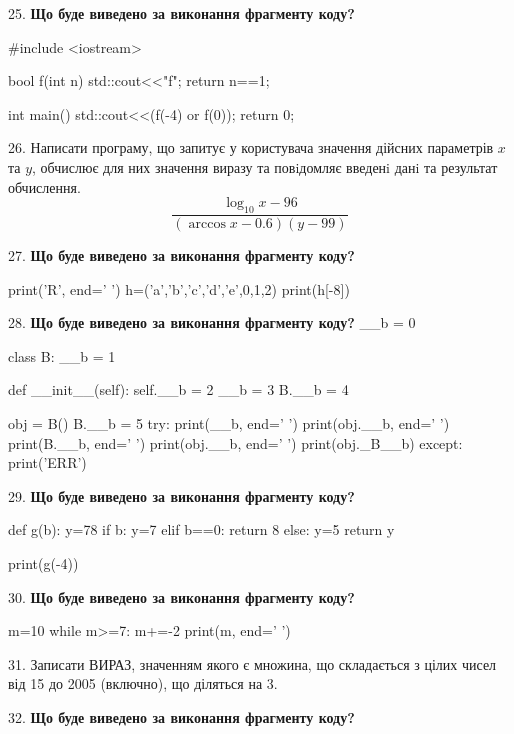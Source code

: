 \documentclass[11pt]{article}
\begin{document}
\par\vspace{5mm}
25. \textbf{Що буде виведено за виконання фрагменту коду?}

#include <iostream>

bool f(int n){
    std::cout<<"f";
    return n==1;
}

int main(){
    std::cout<<(f(-4) or f(0));
    return 0;
}
\par\vspace{5mm}
26. 
Написати програму, що запитує у користувача значення дійсних параметрів $x$ та $y$, обчислює для них значення виразу та повiдомляє введенi данi та результат обчислення.
$$\frac{\log_{10} x - 96}{(\arccos x - 0.6) (y - 99)}$$ 

\par\vspace{5mm}
27. \textbf{Що буде виведено за виконання фрагменту коду?}

print('R', end=' ')
h=('a','b','c','d','e',0,1,2)
print(h[-8])

\par\vspace{5mm}
28. \textbf{Що буде виведено за виконання фрагменту коду?}
__b = 0

class B:
    __b = 1
    
    def __init__(self):
        self.__b = 2
        __b = 3
        B.__b = 4

obj = B()
B.__b = 5
try:
    print(__b, end=' ')
    print(obj.__b, end=' ')
    print(B.__b, end=' ')
    print(obj.__b, end=' ')
    print(obj._B__b)
except:
    print('ERR')
\par\vspace{5mm}
29. \textbf{Що буде виведено за виконання фрагменту коду?}

def g(b):
    y=78
    if b: 
        y=7
    elif b==0:
         return 8
    else:
         y=5
    return y

print(g(-4))
\par\vspace{5mm}
30. \textbf{Що буде виведено за виконання фрагменту коду?}

m=10
while m>=7:
    m+=-2
print(m, end=' ')

\par\vspace{5mm}
31. 
Записати ВИРАЗ, значенням якого є множина, що складається з цілих чисел від 15 до 2005 (включно), що діляться на 3.\par\vspace{5mm}
32. \textbf{Що буде виведено за виконання фрагменту коду?}
\end{document}
